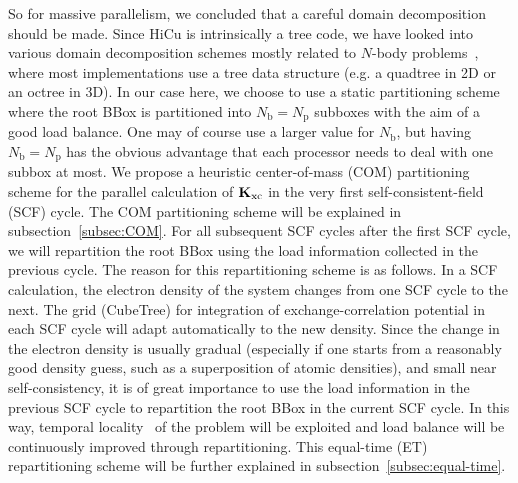 \documentclass[preprint]{revtex4}
\newcommand{\Kxc}{{\bf K}_{\mathrm{xc}}}
\newcommand{\Np}{N_{\mathrm{p}}} \newcommand{\Nbox}{N_{\mathrm{b}}}
\begin{document}
So for massive parallelism, we concluded that a careful domain
decomposition should be made. Since HiCu is intrinsically a tree code,
we have looked into various domain decomposition schemes mostly
related to $N$-body problems~\cite{warren:92_article,Grama94_article,%
Warren95b,Singh93,Singh_95v27,Pilkington96,Grama_98v24}, where most
implementations use a tree data structure (e.g. a quadtree in 2D or an
octree in 3D).  In our case here, we choose to use a static
partitioning scheme where the root BBox is partitioned into $\Nbox =
\Np$ subboxes with the aim of a good load balance.  One may of course
use a larger value for $\Nbox$, but having $\Nbox = \Np$ has the
obvious advantage that each processor needs to deal with one subbox at
most.  We propose a heuristic center-of-mass (COM) partitioning scheme
for the parallel calculation of $\Kxc$ in the very first
self-consistent-field (SCF) cycle.  The COM partitioning scheme will
be explained in subsection~\ref{subsec:COM}.  For all subsequent SCF
cycles after the first SCF cycle, we will repartition the root BBox
using the load information collected in the previous cycle.  The
reason for this repartitioning scheme is as follows.  In a SCF
calculation, the electron density of the system changes from one SCF
cycle to the next.  The grid (CubeTree) for integration of
exchange-correlation potential in each SCF cycle will adapt
automatically to the new density.  Since the change in the electron
density is usually gradual (especially if one starts from a reasonably
good density guess, such as a superposition of atomic densities), and
small near self-consistency, it is of great importance to use the load
information in the previous SCF cycle to repartition the root BBox in
the current SCF cycle. In this way, temporal
locality~\cite{Pilkington96} of the problem will be exploited and load
balance will be continuously improved through repartitioning. This
equal-time (ET) repartitioning scheme will be further explained in
subsection~\ref{subsec:equal-time}.
\end{document}
